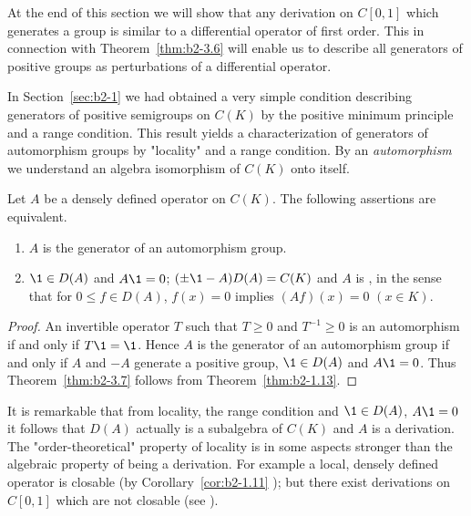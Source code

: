 At the end of this section we will show that any derivation on $C[0,1]$ which generates a group is similar to a differential operator of first order.
This in connection with Theorem~\ref{thm:b2-3.6} will enable us to describe all generators of positive groups as perturbations of a differential operator.

In Section~\ref{sec:b2-1} we had obtained a very simple condition describing generators of positive semigroups on $C(K)$ by the positive minimum principle and a range condition.
This result yields a characterization of generators of automorphism groups by "locality" and a range condition.
By an \emph{automorphism} we understand an algebra isomorphism of\/ $C(K)$ onto itself.
\begin{theorem}\label{thm:b2-3.7}
Let $A$ be a densely defined operator on $C(K)$.
The following assertions are equivalent.
\begin{enumerate}[\upshape (a)]
\item \label{thm:b2-3.7-1}
$A$ is the generator of an automorphism group.
\item \label{thm:b2-3.7-2}
$\1 \in D(A)$ and $A\1 = 0$; $(\pm \1 - A)D(A) = C(K)$ and $A$ is , in the sense that for $0 \leq f \in D(A)$, $f(x) = 0$ implies $(Af)(x) = 0$ $(x \in K)$.
\end{enumerate}
\end{theorem}

\begin{proof}
An invertible operator $T$ such that $T \geq 0$ and $T^{-1} \geq 0$ is an automorphism if and only if\/ $T\1 = \1$.
Hence $A$ is the generator of an automorphism group if and only if\/ $A$ and $-A$ generate a positive group, $\1 \in D(A)$ and $A\1 = 0$.
Thus Theorem~\ref{thm:b2-3.7} follows from Theorem~\ref{thm:b2-1.13}.
\end{proof}

\begin{remark*}\label{rem:b2-3.7a}
It is remarkable that from locality, the range condition and $\1 \in D(A)$, $A\1 = 0$ it follows that $D(A)$ actually is a subalgebra of\/ $C(K)$ and $A$ is a derivation.
The "order-theoretical" property of locality is in some aspects stronger than the algebraic property of being a derivation.
For example a local, densely defined operator is closable (by Corollary~\ref{cor:b2-1.11} ); but there exist derivations on $C[0,1]$ which are not closable (see \textcite{brattelirobinson:1975}).
\end{remark*}

